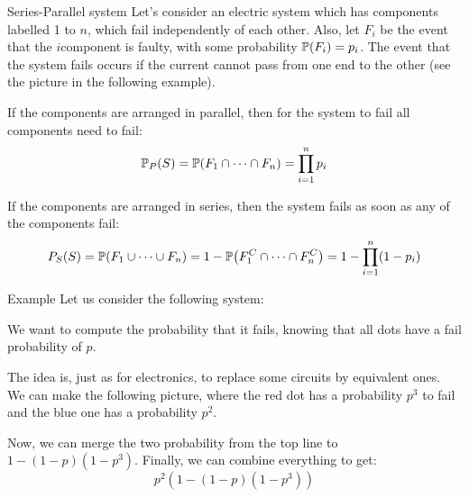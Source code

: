 \documentclass[a4paper]{article}
\begin{document}
\begin{parag}{Series-Parallel system}
    Let's consider an electric system which has components labelled 1 to $n$, which fail independently of each other. Also, let $F_i$ be the event that the $i$\Th component is faulty, with some probability $\prob\left(F_i\right) = p_i$. The event that the system fails occurs if the current cannot pass from one end to the other (see the picture in the following example).

    If the components are arranged in parallel, then for the system to fail all components need to fail: 
    \[\prob_P\left(S\right) = \prob\left(F_1 \cap \cdots \cap F_n\right) = \prod_{i=1}^{n} p_i\]
    
    If the components are arranged in series, then the system fails as soon as any of the components fail: 
    \[P_S\left(S\right) = \prob\left(F_1 \cup \cdots \cup F_n\right) = 1 - \prob\left(F_1^C \cap \cdots \cap F_n^C\right) = 1 - \prod_{i=1}^{n} \left(1-p_ i\right)\]
\end{parag}

\begin{parag}{Example}
    Let us consider the following system:

    We want to compute the probability that it fails, knowing that all dots have a fail probability of $p$.

    The idea is, just as for electronics, to replace some circuits by equivalent ones. We can make the following picture, where the red dot has a probability $p^3$ to fail and the blue one has a probability $p^2$.

    Now, we can merge the two probability from the top line to $1 - \left(1 - p\right)\left(1 - p^3\right)$. Finally, we can combine everything to get: 
    \[p^2 \left(1-\left(1-p\right)\left(1-p^3\right)\right)\]
\end{parag}
\end{document}
